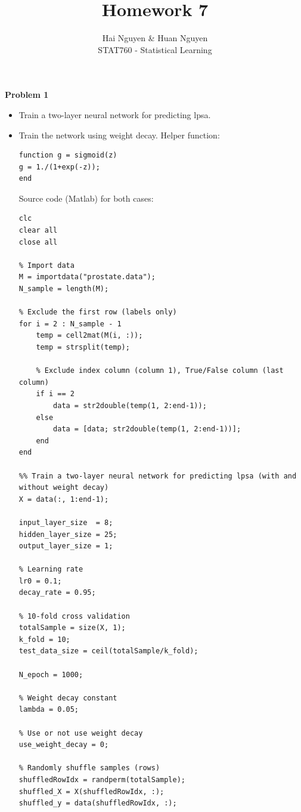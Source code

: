 \documentclass[12pt]{article}
\begin{document}
 
 
 
\title{Homework 7}%
\author{Hai Nguyen \& Huan Nguyen\\ %
STAT760 - Statistical Learning} %
\maketitle
\textbf{Problem 1}
\begin{itemize}
    \item Train a two-layer neural network for predicting lpsa.
    \item Train the network using weight decay.
    Helper function:
    \begin{lstlisting}
function g = sigmoid(z)
g = 1./(1+exp(-z));
end
    \end{lstlisting}
    Source code (Matlab) for both cases:
    \begin{lstlisting}
clc
clear all
close all

% Import data
M = importdata("prostate.data");
N_sample = length(M);

% Exclude the first row (labels only)
for i = 2 : N_sample - 1
    temp = cell2mat(M(i, :));
    temp = strsplit(temp);
    
    % Exclude index column (column 1), True/False column (last column)
    if i == 2
        data = str2double(temp(1, 2:end-1));  
    else
        data = [data; str2double(temp(1, 2:end-1))];
    end
end

%% Train a two-layer neural network for predicting lpsa (with and without weight decay)
X = data(:, 1:end-1);

input_layer_size  = 8;
hidden_layer_size = 25;
output_layer_size = 1;

% Learning rate
lr0 = 0.1;
decay_rate = 0.95;

% 10-fold cross validation
totalSample = size(X, 1);
k_fold = 10;
test_data_size = ceil(totalSample/k_fold);

N_epoch = 1000;

% Weight decay constant
lambda = 0.05;

% Use or not use weight decay
use_weight_decay = 0;

% Randomly shuffle samples (rows)
shuffledRowIdx = randperm(totalSample);
shuffled_X = X(shuffledRowIdx, :);
shuffled_y = data(shuffledRowIdx, :);


\end{lstlisting}
\end{itemize}
\end{document}

